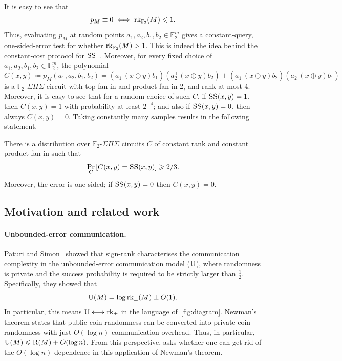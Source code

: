 \documentclass{article}
\begin{document}
It is easy to see that
\[p_{M} \equiv 0 \iff \operatorname{rk}_{\mathbb{F}_2}(M)\leqslant 1.\]
Thus, evaluating $p_{M}$ at random points $a_1,a_2,b_1,b_2\in\mathbb{F}_2^m$ gives a constant-query,
one-sided-error test for whether $\operatorname{rk}_{\mathbb{F}_2}(M)>1$. 
This is indeed the idea behind the constant-cost protocol for $\operatorname{\textsc{SS}}$~\cite{SS24,GHR25}.
Moreover, for every fixed choice of $a_1,a_2,b_1,b_2\in\mathbb{F}_2^m$, the polynomial 
\[C(x,y) \coloneqq p_{M}(a_1,a_2,b_1,b_2) = (a_1^\top (x\oplus y) b_1)( a_2^\top (x\oplus y) b_2)+(a_1^\top (x\oplus y) b_2)(a_2^\top (x\oplus y) b_1) \]
is a $\mathbb{F}_2$-$\Sigma\Pi\Sigma$ circuit with top fan-in and product fan-in 2, and rank at most 4. Moreover, it is easy to see that for a random choice of such $C$, if $\operatorname{\textsc{SS}}(x,y)=1$, then $C(x,y)=1$ with probability at least $2^{-4}$; and also if $\operatorname{\textsc{SS}}(x,y)=0$, then always $C(x,y)=0$. Taking constantly many samples  results in the following statement.
\begin{boxtheorem}
    There is a distribution over $\mathbb{F}_2$-$\Sigma\Pi\Sigma$ circuits $C$ of  constant rank and constant product fan-in  such that
    \[\Pr_{C}\left[C(x,y) = \operatorname{\textsc{SS}}(x,y)\right]\geqslant 2/3.\]
    Moreover, the error is one-sided; if $\operatorname{\textsc{SS}}(x,y)=0$ then $C(x,y)=0$.
\end{boxtheorem}

 
\subsection{Motivation and related work} \label{sec:related-work}

\paragraph{Unbounded-error communication.}
Paturi and Simon~\cite{PS86} showed that sign-rank characterises the communication complexity in the unbounded-error communication model ($\operatorname{U}$), where randomness is private and the success probability is required to be strictly larger than $\frac{1}{2}$. Specifically, they showed that
\[
\operatorname{U}(M) = \log{\operatorname{rk}_\pm(M)} \pm O(1).
\]
In particular, this means $\operatorname{U}\longleftrightarrow \operatorname{rk}_\pm$ in the language of~\cref{fig:diagram}. Newman's theorem \cite{NEWMAN1991} states that public-coin randomness can be converted into private-coin randomness with just $O(\log{n})$ communication overhead. Thus, in particular, $\operatorname{U}(M) \leqslant \operatorname{R}(M) + O(\log{n})$. From this perspective,  asks whether one can get rid of the $O(\log n)$ dependence in this application of Newman's theorem. 
\end{document}
